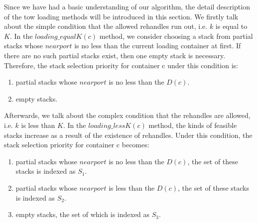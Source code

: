 \documentclass[review,3p,times,authoryear,12pt]{elsarticle}
\begin{document}
Since we have had a basic understanding of our algorithm, the detail description of the tow loading methods will be introduced in this section.
We firstly talk about the simple condition that the allowed rehandles run out, i.e. $k$ is equal to $K$.
In the $loading\_equalK(c)$ method, we consider choosing a stack from partial stacks whose $nearport$ is no less than the current loading container at first.
If there are no such partial stacks exist, then one empty stack is necessary.
Therefore, the stack selection priority for container c under this condition is:

\begin{enumerate}
\item partial stacks whose $nearport$ is no less than the $D(c)$.
\item empty stacks.
\end{enumerate}


Afterwards, we talk about the complex condition that the rehandles are allowed, i.e. $k$ is less than $K$.
In the $loading\_lessK(c)$ method, the kinds of feasible stacks increase as a result of the existence of rehandles.
Under this condition, the stack selection priority for container c becomes:

\begin{enumerate}
\item partial stacks whose $nearport$ is no less than the $D(c)$, the set of these stacks is indexed as $S_1$.
\item partial stacks whose $nearport$ is less than the $D(c)$, the set of these stacks is indexed as $S_2$.
\item empty stacks, the set of which is indexed as $S_3$.
\end{enumerate}

\end{document}
